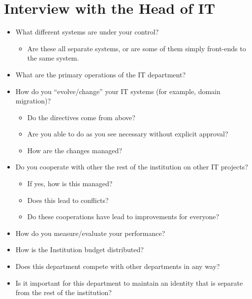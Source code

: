 \section*{Interview with the Head of IT}
\begin{itemize}
	\item What different systems are under your control?
	  \begin{itemize}
	   \item Are these all separate systems, or are some of them simply front-ends to the same system.
	  \end{itemize}
	\item What are the primary operations of the IT department?
	\item How do you ``evolve/change'' your IT systems (for example, domain migration)?
	\begin{itemize}
		\item Do the directives come from above?
		\item Are you able to do as you see necessary without explicit approval?
		\item How are the changes managed?
	\end{itemize}
	\item Do you cooperate with other the rest of the institution on other IT projects?
	\begin{itemize}
		\item If yes, how is this managed?
		\item Does this lead to conflicts?
		\item Do these cooperations have lead to improvements for everyone?
	\end{itemize}
	\item How do you measure/evaluate your performance?
	\item How is the Institution budget distributed?
\item Does this department compete with other departments in any way?
\item Is it important for this department to maintain an identity that is separate from the rest of the institution?
\end{itemize}

